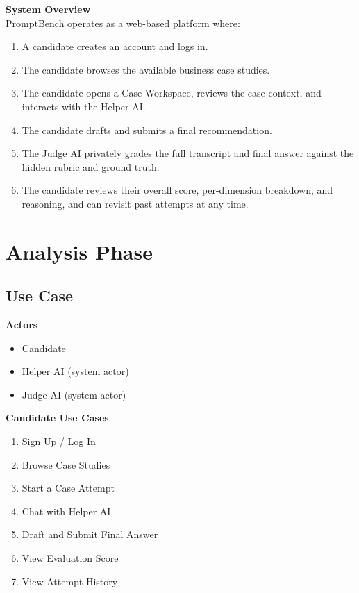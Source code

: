 \documentclass[11pt]{article}
\begin{document}
\textbf{System Overview}\\
PromptBench operates as a web-based platform where:
\begin{enumerate}[nosep]
  \item A candidate creates an account and logs in.
  \item The candidate browses the available business case studies.
  \item The candidate opens a Case Workspace, reviews the case context, and interacts with the Helper AI.
  \item The candidate drafts and submits a final recommendation.
  \item The Judge AI privately grades the full transcript and final answer against the hidden rubric and ground truth.
  \item The candidate reviews their overall score, per-dimension breakdown, and reasoning, and can revisit past attempts at any time.
\end{enumerate}

\newpage
\section{Analysis Phase}

\subsection{Use Case}

\textbf{Actors}
\begin{itemize}[nosep]
  \item Candidate
  \item Helper AI (system actor)
  \item Judge AI (system actor)
\end{itemize}

\textbf{Candidate Use Cases}
\begin{enumerate}[nosep]
  \item Sign Up / Log In
  \item Browse Case Studies
  \item Start a Case Attempt
  \item Chat with Helper AI
  \item Draft and Submit Final Answer
  \item View Evaluation Score
  \item View Attempt History
\end{enumerate}
\end{document}
